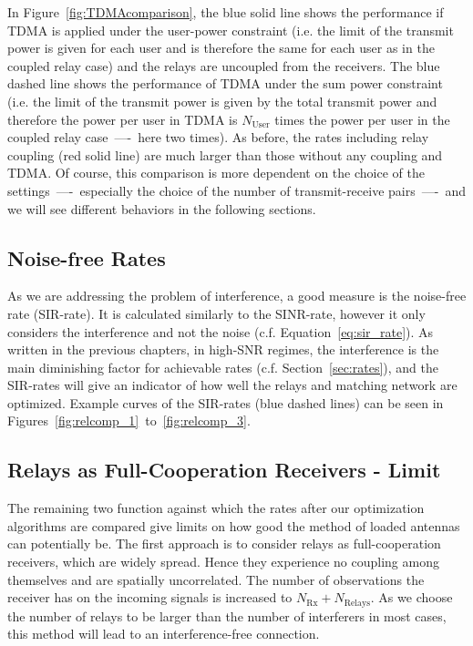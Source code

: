 In Figure~\ref{fig:TDMAcomparison}, the blue solid line shows the performance if TDMA is applied under the user-power constraint (i.e. the limit of the transmit power is given for each user and is therefore the same for each user as in the coupled relay case) and the relays are uncoupled from the receivers.
The blue dashed line shows the performance of TDMA under the sum power constraint (i.e. the limit of the transmit power is given by the total transmit power and therefore the power per user in TDMA is $N_\text{User}$ times the power per user in the coupled relay case~----~here two times).
As before, the rates including relay coupling (red solid line) are much larger than those without any coupling and TDMA.
Of course, this comparison is more dependent on the choice of the settings~----~especially the choice of the number of transmit-receive pairs~----~and we will see different behaviors in the following sections. 

\subsection{Noise-free Rates}
\label{sec:sir}
As we are addressing the problem of interference, a good measure is the noise-free rate (SIR-rate).
It is calculated similarly to the SINR-rate, however it only considers the interference and not the noise (c.f. Equation~\eqref{eq:sir_rate}).
As written in the previous chapters, in high-SNR regimes, the interference is the main diminishing factor for achievable rates (c.f. Section~\ref{sec:rates}), and the SIR-rates will give an indicator of how well the relays and matching network are optimized.
Example curves of the SIR-rates (blue dashed lines) can be seen in Figures~\ref{fig:relcomp_1}~to~\ref{fig:relcomp_3}.

\subsection{Relays as Full-Cooperation Receivers - Limit}
\label{sec:fullrx_limit}
The remaining two function against which the rates after our optimization algorithms are compared give limits on how good the method of loaded antennas can potentially be.
The first approach is to consider relays as full-cooperation receivers, which are widely spread.
Hence they experience no coupling among themselves and are spatially uncorrelated.
The number of observations the receiver has on the incoming signals is increased to $N_\text{Rx} + N_\text{Relays}$.
As we choose the number of relays to be larger than the number of interferers in most cases, this method will lead to an interference-free connection.

